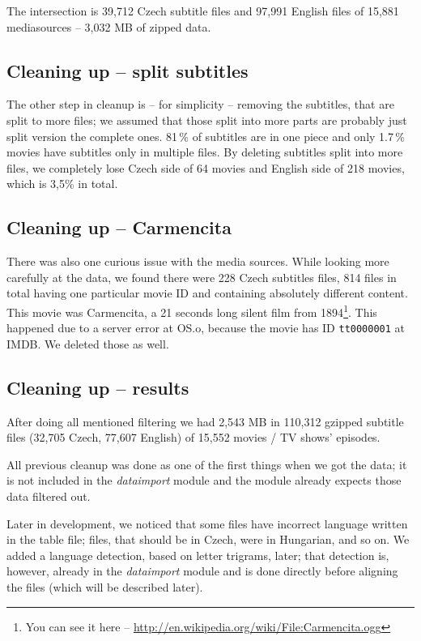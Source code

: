 The intersection is 39,712 Czech subtitle files and 97,991 English files of 15,881 mediasources -- 3,032 MB of zipped data.

\subsection*{Cleaning up -- split subtitles}
The other step in cleanup is -- for simplicity -- removing the subtitles, that are split to more files; we assumed that those split into more parts are probably just split version the complete ones. 81\,\% of subtitles are in one piece and only 1.7\,\% movies have subtitles only in multiple files. By deleting subtitles split into more files, we completely lose Czech side of 64 movies and English side of 218 movies, which is 3,5\% in total.

\subsection*{Cleaning up -- Carmencita}
There was also one curious issue with the media sources. While looking more carefully at the data, we found there were 228 Czech subtitles files, 814 files in total having one particular movie ID and containing absolutely different content. This movie was Carmencita, a 21 seconds long silent film from 1894\footnote{You can see it here -- \url{http://en.wikipedia.org/wiki/File:Carmencita.ogg}}. This happened due to a server error at OS.o, because the movie has ID {\tt tt0000001} at IMDB. We deleted those as well.


\subsection*{Cleaning up -- results}
After doing all mentioned filtering we had 2,543 MB in 110,312 gzipped subtitle files (32,705 Czech, 77,607 English) of 15,552 movies / TV shows' episodes.

All previous cleanup was done as one of the first things when we got the data; it is not included in the \emph{dataimport} module and the module already expects those data filtered out.

Later in development, we noticed that some files have incorrect language written in the table file; files, that should be in Czech, were in  Hungarian, and so on. We added a language detection, based on letter trigrams, later; that detection is, however, already in the \emph{dataimport} module and is done directly before aligning the files (which will be described later).

